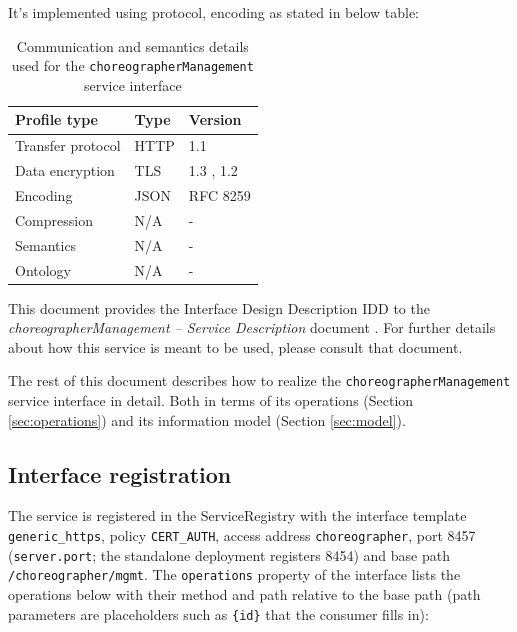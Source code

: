 \documentclass[a4paper]{arrowhead}
\begin{document}
It's implemented using protocol, encoding as stated in below table:
\begin{table}[ht!]
  \centering
  \begin{tabular}{|l|l|l|}
    \hline
    \rowcolor{gray!33} Profile type & Type & Version \\ \hline
    Transfer protocol & HTTP & 1.1 \cite{rfc9112} \\ \hline
    Data encryption & TLS & 1.3 \cite{rfc8446}, 1.2 \cite{rfc5246} \\ \hline
    Encoding & JSON & RFC 8259 \cite{rfc8259} \\ \hline
    Compression & N/A & - \\ \hline
    Semantics & N/A & - \\ \hline
    Ontology & N/A & - \\ \hline
  \end{tabular}
  \caption{Communication and semantics details used for the \texttt{choreographer\allowbreak{}Management} service interface}
  \label{tab:comunication_semantics_profile}
\end{table}

This document provides the Interface Design Description IDD to the \textit{choreographerManagement -- Service Description} document \cite{cho-choreographerManagement-sd}.
For further details about how this service is meant to be used, please consult that document.

The rest of this document describes how to realize the \texttt{choreographer\allowbreak{}Management} service
interface in detail. Both in terms of its operations (Section \ref{sec:operations}) and its information model (Section \ref{sec:model}).

\subsection{Interface registration}

The service is registered in the ServiceRegistry with the interface template \texttt{generic\_\allowbreak{}https}, policy \texttt{CERT\_\allowbreak{}AUTH}, access address \texttt{choreographer}, port 8457 (\texttt{server.\allowbreak{}port}; the standalone deployment registers 8454) and base path \texttt{/\allowbreak{}choreographer/\allowbreak{}mgmt}. The \texttt{operations} property of the interface lists the operations below with their method and path relative to the base path (path parameters are placeholders such as \texttt{\{id\}} that the consumer fills in):
\end{document}
